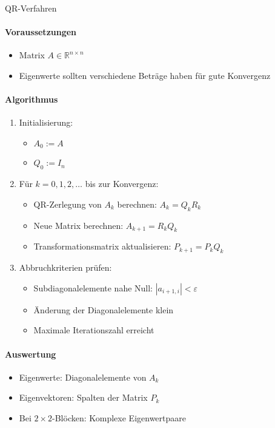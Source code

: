 \begin{KR}{QR-Verfahren}
\paragraph{Voraussetzungen}
\begin{itemize}
    \item Matrix $A \in \mathbb{R}^{n \times n}$
    \item Eigenwerte sollten verschiedene Beträge haben für gute Konvergenz
\end{itemize}

\paragraph{Algorithmus}
\begin{enumerate}
    \item Initialisierung:
    \begin{itemize}
        \item $A_0 := A$
        \item $Q_0 := I_n$
    \end{itemize}

    \item Für $k = 0,1,2,\ldots$ bis zur Konvergenz:
    \begin{itemize}
        \item QR-Zerlegung von $A_k$ berechnen: $A_k = Q_kR_k$
        \item Neue Matrix berechnen: $A_{k+1} = R_kQ_k$
        \item Transformationsmatrix aktualisieren: $P_{k+1} = P_kQ_k$
    \end{itemize}

    \item Abbruchkriterien prüfen:
    \begin{itemize}
        \item Subdiagonalelemente nahe Null: $|a_{i+1,i}| < \varepsilon$
        \item Änderung der Diagonalelemente klein
        \item Maximale Iterationszahl erreicht
    \end{itemize}
\end{enumerate}

\paragraph{Auswertung}
\begin{itemize}
    \item Eigenwerte: Diagonalelemente von $A_k$
    \item Eigenvektoren: Spalten der Matrix $P_k$
    \item Bei $2\times2$-Blöcken: Komplexe Eigenwertpaare
\end{itemize}
\end{KR}

